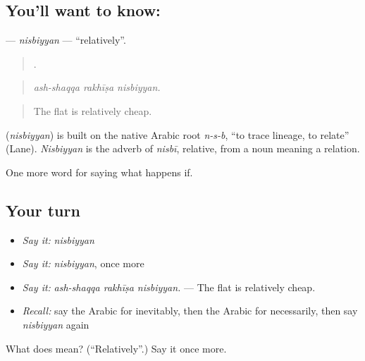 \subsection*{You'll want to know: }
\textbf{} — \emph{nisbiyyan} — \textquotedblleft{}relatively\textquotedblright{}.

\begin{quote}
  .
\end{quote}

\begin{quote}
\emph{ash-shaqqa rakhīṣa nisbiyyan.}
\end{quote}

\begin{quote}
The flat is relatively cheap.
\end{quote}

\begin{cousinweb}
\textbf{} (\emph{nisbiyyan}) is built on the native Arabic root \emph{n-s-b}, \textquotedblleft{}to trace lineage, to relate\textquotedblright{} (Lane). \emph{Nisbiyyan} is the adverb of \emph{nisbī}, relative, from a noun meaning a relation.
\end{cousinweb}

\begin{grammarlens}[title={What you've built}]
One more word for saying what happens if.
\end{grammarlens}

\subsection*{Your turn}
\begin{itemize}
\raggedright
  \item \emph{Say it:} \emph{nisbiyyan}
  \item \emph{Say it:} \emph{nisbiyyan}, once more
  \item \emph{Say it:} \emph{ash-shaqqa rakhīṣa nisbiyyan.} — The flat is relatively cheap.
  \item \emph{Recall:} say the Arabic for inevitably, then the Arabic for necessarily, then say \emph{nisbiyyan} again
\end{itemize}

\begin{tcolorbox}[breakable,colback=teal!4,colframe=teal!35!black,title={Before you move on}]
What does  mean? (\textquotedblleft{}Relatively\textquotedblright{}.) Say it once more.
\end{tcolorbox}
